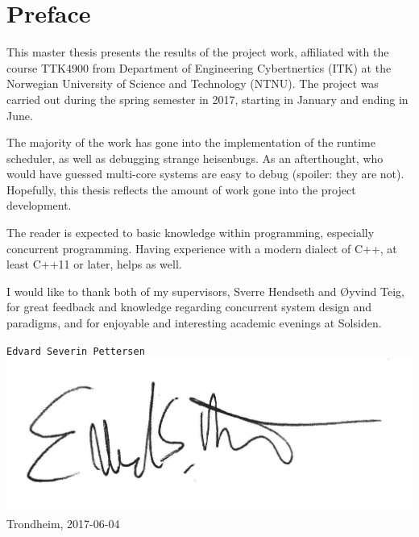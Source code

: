 
\newpage
{}
\section*{Preface}


This master thesis presents the results of the project work, affiliated with the course TTK4900
from Department of Engineering Cybertnertics (ITK) at the Norwegian University of Science
and Technology (NTNU). The project was carried out during the spring semester in 2017, starting in January and ending in June.

The majority of the work has gone into the implementation of the runtime scheduler, as well as debugging strange heisenbugs. As an afterthought, who would have guessed multi\hyp{}core systems are easy to debug (spoiler: they are not). Hopefully, this thesis reflects the amount of work gone into the project development.

The reader is expected to basic knowledge within programming, especially concurrent programming. Having experience with a modern dialect of C++, at least C++11 or later, helps as well. 

I would like to thank both of my supervisors, Sverre Hendseth and Øyvind Teig, for great feedback and knowledge regarding concurrent system design and paradigms, and for enjoyable and interesting academic evenings at Solsiden.


\begin{flushright}
\texttt{Edvard Severin Pettersen}\\
\includegraphics[width=0.3\linewidth,right]{fig/signature}
Trondheim, 2017-06-04
\end{flushright}

\afterpage{\blankpage}
